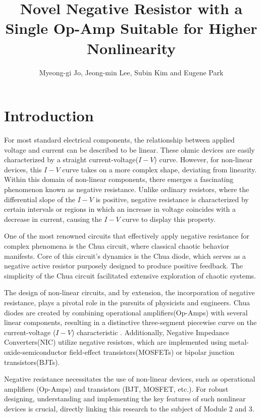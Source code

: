 \documentclass[12pt]{article}
\begin{document}
\title{Novel Negative Resistor with a Single Op-Amp Suitable for Higher Nonlinearity}

\author{Myeong-gi Jo, Jeong-min Lee, Subin Kim and Eugene Park}

\maketitle

\section{Introduction}


For most standard electrical components, the relationship between applied voltage and current can be described to be linear. These ohmic devices are easily characterized by a straight current-voltage(\(I-V\)) curve. However, for non-linear devices, this \(I-V\) curve takes on a more complex shape, deviating from linearity. Within this domain of non-linear components, there emerges a fascinating phenomenon known as negative resistance. Unlike ordinary resistors, where the differential slope of the \(I-V\) is positive, negative resistance is characterized by certain intervals or regions in which an increase in voltage coincides with a decrease in current, causing the \(I-V\) curve to display this property.

One of the most renowned circuits that effectively apply negative resistance for complex phenomena is the Chua circuit, where classical chaotic behavior manifests. Core of this circuit's dynamics is the Chua diode, which serves as a negative active resistor purposely designed to produce positive feedback. The simplicity of the Chua circuit facilitated extensive exploration of chaotic systems\cite{impact_chua}.

The design of non-linear circuits, and by extension, the incorporation of negative resistance, plays a pivotal role in the pursuits of physicists and engineers. Chua diodes are created by combining operational amplifiers(Op-Amps) with several linear components, resulting in a distinctive three-segment piecewise curve on the current-voltage ($I-V$) characteristic \cite{chua_circuit}. Additionally, Negative Impedance Converters(NIC) utilize negative resistors, which are implemented using metal-oxide-semiconductor field-effect transistors(MOSFETs) or bipolar junction transistors(BJTs)\cite{NIC_BJT,NIC_MOSFET,NIC_MOSFET2}.

Negative resistance necessitates the use of non-linear devices, such as operational amplifiers (Op-Amps) and transistors (BJT, MOSFET, etc.). For robust designing, understanding and implementing the key features of such nonlinear devices is crucial, directly linking this research to the subject of Module 2 and 3. 
\end{document}
